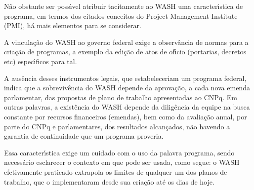 \documentclass[
12pt,		%
openright,	%
twoside,  %
a4paper,			%
chapter=TITLE,		%
english,			%
french,				%
spanish,			%
brazil				%
]{USPSC-classe/USPSC}
\begin{document}
N\~ao obstante ser poss\'{\i}vel atribuir tacitamente ao WASH uma caracter\'{\i}stica de programa, em termos dos citados conceitos do Project Management Institute (PMI), h\'a mais elementos para se considerar.

















A vincula\c{c}\~ao do WASH ao governo federal exige a observ\^ancia de normas para a cria\c{c}\~ao de programas, a exemplo da edi\c{c}\~ao de atos de of\'{\i}cio (portarias, decretos etc) espec\'{\i}ficos para tal.

















A aus\^encia desses instrumentos legais, que estabeleceriam um \textquotedbl programa federal\textquotedbl , indica que a sobreviv\^encia do WASH depende da aprova\c{c}\~ao, a cada nova emenda parlamentar, das propostas de plano de trabalho apresentadas ao CNPq. Em outras palavras, a exist\^encia do WASH depende da dilig\^encia da equipe na busca constante por recursos financeiros (emendas), bem como da avalia\c{c}\~ao anual, por parte do CNPq e parlamentares, dos resultados alcan\c{c}ados, n\~ao havendo a garantia de continuidade que um programa proveria.

















Essa caracter\'{\i}stica exige um cuidado com o uso da palavra \textquotedbl programa\textquotedbl , sendo necess\'ario esclarecer o contexto em que pode ser usada, como segue: o WASH efetivamente praticado extrapola os limites de qualquer um dos planos de trabalho, que o implementaram desde sua cria\c{c}\~ao at\'e os dias de hoje.
\end{document}
